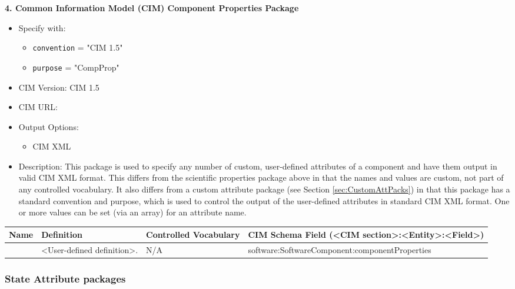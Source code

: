 \vspace{.20in}

{\bf 4. Common Information Model (CIM) Component Properties Package}

\begin{itemize}
    \item Specify with:
    \begin{itemize}
        \item {\tt convention} = "CIM 1.5"
        \item {\tt purpose} = "CompProp"
    \end{itemize}
    \item CIM Version: CIM 1.5
    \item CIM URL: 
    \item Output Options: 
    \begin{itemize}
        \item CIM XML
    \end{itemize}  
    \item Description: This package is used to specify any number of custom, user-defined attributes of a component and have them output in valid CIM XML format.  This differs from the scientific properties package above in that the names and values are custom, not part of any controlled vocabulary.  It also differs from a custom attribute package (see Section \ref{sec:CustomAttPacks}) in that this package has a standard convention and purpose, which is used to control the output of the user-defined attributes in standard CIM XML format.  One or more values can be set (via an array) for an attribute name.
\end{itemize}

\begin{tabular}{|p{5cm}|p{5cm}|p{35mm}|p{15mm}|}
     \hline\hline
     {\bf Name} & {\bf Definition} & {\bf Controlled Vocabulary} & {\bf CIM Schema Field \linebreak (<CIM section>:<Entity>:<Field>)}\\
     \hline\hline
     {\tt <User-defined name>} & <User-defined definition>. & N/A & software:SoftwareComponent:componentProperties \\
     \hline\hline
\end{tabular}

\vspace{.20in}

\subsubsection{State Attribute packages}
\label{StateAttributePackages}

